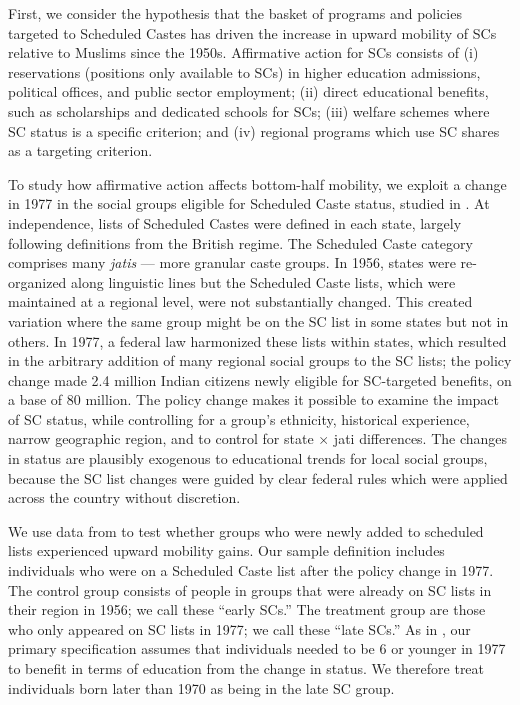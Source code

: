 \documentclass[12pt,letterpaper]{article}
\numberwithin{equation}{section}
\begin{document}
First, we consider the hypothesis that the basket of programs and policies targeted to Scheduled Castes has driven the increase in upward mobility of SCs relative to Muslims since the 1950s. Affirmative action for SCs consists of (i) reservations (positions only available to SCs) in higher education admissions, political offices, and public sector employment; (ii) direct educational benefits, such as scholarships and dedicated schools for SCs; (iii) welfare schemes where SC status is a specific criterion; and (iv) regional programs which use SC shares as a targeting criterion.

To study how affirmative action affects bottom-half mobility, we exploit a change in 1977 in the social groups eligible for Scheduled Caste status, studied in . At independence, lists of Scheduled Castes were defined in each state, largely following definitions from the British regime. The Scheduled Caste category comprises many  \textit{jatis} --- more granular caste groups. In 1956, states were re-organized along linguistic lines but the Scheduled Caste lists, which were maintained at a regional level, were not substantially changed. This created variation where the same group might be on the SC list in some states but not in others. In 1977, a federal law harmonized these lists within states, which resulted in the arbitrary addition of many regional social groups to the SC lists; the policy change made 2.4 million Indian citizens newly eligible for SC-targeted benefits, on a base of 80 million. The policy change makes it possible to examine the impact of SC status, while controlling for a group's ethnicity, historical experience, narrow geographic region, and to control for state $\times$ jati differences. The changes in status are plausibly exogenous to educational trends for local social groups, because the SC list changes were guided by clear federal rules which were applied across the country without discretion.

We use data from  to test whether groups who were newly added to scheduled lists experienced upward mobility gains. Our sample definition includes individuals who were on a Scheduled Caste list after the policy change in 1977. The control group consists of people in groups that were already on SC lists in their region in 1956; we call these ``early SCs.'' The treatment group are those who only appeared on SC lists in 1977; we call these ``late SCs.'' As in , our primary specification assumes that individuals needed to be 6 or younger in 1977 to benefit in terms of education from the change in status. We therefore treat individuals born later than 1970 as being in the late SC group.
\end{document}
